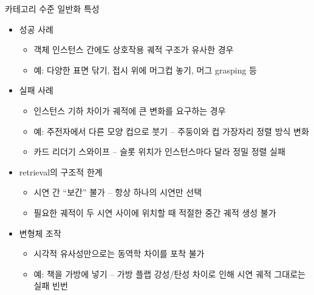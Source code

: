 \documentclass[aspectratio=169]{beamer}
\begin{document}
\begin{frame}{카테고리 수준 일반화 특성}
  \small
  \begin{itemize}
    \item 성공 사례
    \begin{itemize}
      \item 객체 인스턴스 간에도 상호작용 궤적 구조가 유사한 경우
      \item 예: 다양한 표면 닦기, 접시 위에 머그컵 놓기, 머그 grasping 등
    \end{itemize}
    \item 실패 사례
    \begin{itemize}
      \item 인스턴스 기하 차이가 궤적에 큰 변화를 요구하는 경우
      \item 예: 주전자에서 다른 모양 컵으로 붓기 – 주둥이와 컵 가장자리 정렬 방식 변화
      \item 카드 리더기 스와이프 – 슬롯 위치가 인스턴스마다 달라 정밀 정렬 실패
    \end{itemize}
    \item retrieval의 구조적 한계
    \begin{itemize}
      \item 시연 간 ``보간'' 불가 – 항상 하나의 시연만 선택
      \item 필요한 궤적이 두 시연 사이에 위치할 때 적절한 중간 궤적 생성 불가
    \end{itemize}
    \item 변형체 조작
    \begin{itemize}
      \item 시각적 유사성만으로는 동역학 차이를 포착 불가
      \item 예: 책을 가방에 넣기 – 가방 플랩 강성/탄성 차이로 인해 시연 궤적 그대로는 실패 빈번
    \end{itemize}
  \end{itemize}
\end{frame}
\end{document}

